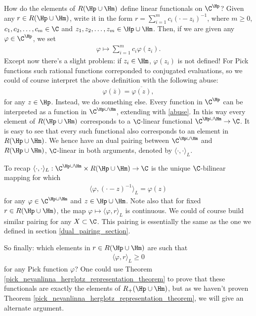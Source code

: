 How do the elements of $R(\Hp \cup \Hm)$ define linear functionals on $\C^{\Hp}$? Given any $r \in R(\Hp \cup \Hm)$, write it in the form $r = \sum_{i = 1}^{m} c_{i} (\cdot - z_{i})^{-1}$, where $m \geq 0$, $c_{1}, c_{2}, \ldots, c_{m} \in \C$ and $z_{1}, z_{2}, \ldots, z_{m} \in \Hp \cup \Hm$. Then, if we are given any $\varphi \in \C^{\Hp}$, we set
\begin{align*}
	\varphi \mapsto \sum_{i = 1}^{m} c_{i} \varphi(z_{i}).
\end{align*}
Except now there's a slight problem: if $z_{i} \in \Hm$, $\varphi(z_{i})$ is not defined! For Pick functions such rational functions correponded to conjugated evaluations, so we could of course interpret the above definition with the following abuse:
\begin{align}\label{abuse}
	\varphi(\overline{z}) = \overline{\varphi(z)},
\end{align}
for any $z \in \Hp$. Instead, we do something else. Every function in $\C^{\Hp}$ can be interpreted as a function in $\C^{\Hp \cup \Hm}$, extending with \ref{abuse}. In this way every element of $R(\Hp \cup \Hm)$ corresponds to a $\C$-linear functional $\C^{\Hp \cup \Hm} \to \C$. It is easy to see that every such functional also corresponds to an element in $R(\Hp \cup \Hm)$. We hence have an dual pairing between $\C^{\Hp \cup \Hm}$ and $R(\Hp \cup \Hm)$, $\C$-linear in both arguments, denoted by $\langle \cdot, \cdot \rangle_{L}$.

To recap $\langle \cdot, \cdot \rangle_{L} : \C^{\Hp \cup \Hm} \times R(\Hp \cup \Hm) \to \C$ is the unique $\C$-bilinear mapping for which
\begin{align*}
	\langle \varphi, (\cdot - z)^{-1}\rangle_{L} = \varphi(z)
\end{align*}
for any $\varphi \in \C^{\Hp \cup \Hm}$ and $z \in \Hp \cup \Hm$. Note also that for fixed $r \in R(\Hp \cup \Hm)$, the map $\varphi \mapsto \langle \varphi, r\rangle_{L}$ is continuous. We could of course build similar pairing for any $X \subset \C$. This pairing is essentially the same as the one we defined in section \ref{dual_pairing_section}.

So finally: which elements in $r \in R(\Hp \cup \Hm)$ are such that
\begin{align*}
	\langle \varphi, r \rangle_{L} \geq 0
\end{align*}
for any Pick function $\varphi$? One could use Theorem \ref{pick_nevanlinna_herglotz_representation_theorem} to prove that these functionals are exactly the elements of $R_{+}(\Hp \cup \Hm)$, but as we haven't proven Theorem \ref{pick_nevanlinna_herglotz_representation_theorem}, we will give an alternate argument.

